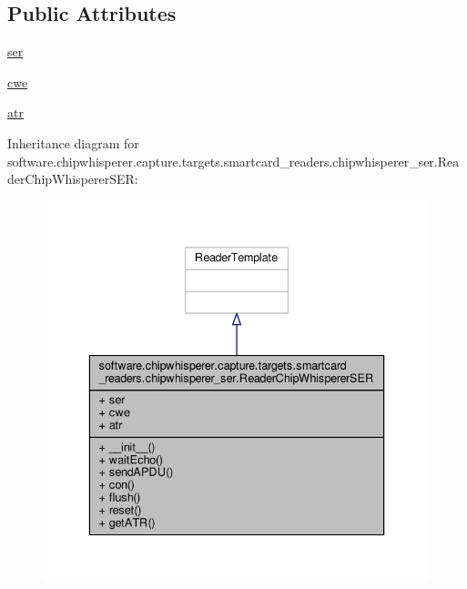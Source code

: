 \subsection*{Public Attributes}
\begin{DoxyCompactItemize}
\item 
\hyperlink{classsoftware_1_1chipwhisperer_1_1capture_1_1targets_1_1smartcard__readers_1_1chipwhisperer__ser_1_1ReaderChipWhispererSER_aa5cdb654f42acac66b5a62299077a963}{ser}
\item 
\hyperlink{classsoftware_1_1chipwhisperer_1_1capture_1_1targets_1_1smartcard__readers_1_1chipwhisperer__ser_1_1ReaderChipWhispererSER_a5dfe180325e6f917464786a4c1cb811f}{cwe}
\item 
\hyperlink{classsoftware_1_1chipwhisperer_1_1capture_1_1targets_1_1smartcard__readers_1_1chipwhisperer__ser_1_1ReaderChipWhispererSER_a6887d4f9073801e6366f8ec8603400df}{atr}
\end{DoxyCompactItemize}


Inheritance diagram for software.\+chipwhisperer.\+capture.\+targets.\+smartcard\+\_\+readers.\+chipwhisperer\+\_\+ser.\+Reader\+Chip\+Whisperer\+S\+E\+R\+:\nopagebreak
\begin{figure}[H]
\begin{center}
\leavevmode
\includegraphics[width=336pt]{d6/d96/classsoftware_1_1chipwhisperer_1_1capture_1_1targets_1_1smartcard__readers_1_1chipwhisperer__ser0eb6ef11ea67e6f95c286245e291ad32}
\end{center}
\end{figure}


